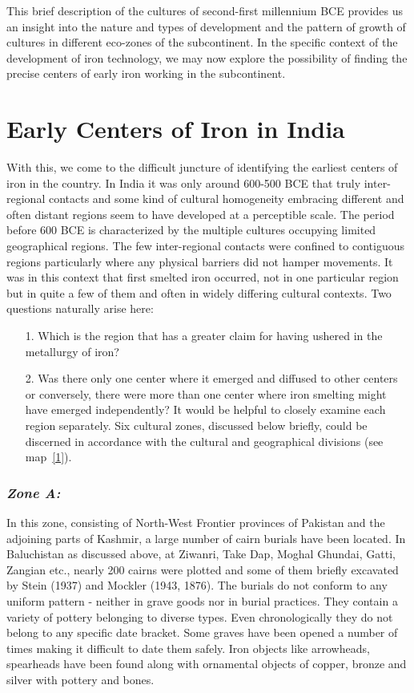This brief description of the cultures of second-first millennium BCE provides us an insight into the nature and types of development and the pattern of growth of cultures in different eco-zones of the subcontinent. In the specific context of the development of iron technology, we may now explore the possibility of finding the precise centers of early iron working in the subcontinent.

\section*{Early Centers of Iron in India}\label{section-4}

With this, we come to the difficult juncture of identifying the earliest centers of iron in the country. In India it was only around 600-500 BCE that truly inter-regional contacts and some kind of cultural homogeneity embracing different and often distant regions seem to have developed at a perceptible scale. The period before 600 BCE is characterized by the multiple cultures occupying limited geographical regions. The few inter-regional contacts were confined to contiguous regions particularly where any physical barriers did not hamper movements. It was in this context that first smelted iron occurred, not in one particular region but in quite a few of them and often in widely differing cultural contexts. Two questions naturally arise here: 
\begin{itemize}
\item[1.] Which is the region that has a greater claim for having ushered in the metallurgy of iron?

\item[2.] Was there only one center where it emerged and diffused to other centers or conversely, there were more than one center where iron smelting might have emerged independently? It would be helpful to closely examine each region separately. Six cultural zones, discussed below briefly, could be discerned in accordance with the cultural and geographical divisions (see map~\ref{1}).
\end{itemize}

\subsubsection*{\textit{Zone A:}}

In this zone, consisting of North-West Frontier provinces of Pakistan and the adjoining parts of Kashmir, a large number of cairn burials have been located. In Baluchistan as discussed above, at Ziwanri, Take Dap, Moghal Ghundai, Gatti, Zangian etc., nearly 200 cairns were plotted and some of them briefly excavated by Stein (1937) and Mockler (1943, 1876). The burials do not conform to any uniform pattern - neither in grave goods nor in burial practices. They contain a variety of pottery belonging to diverse types. Even chronologically they do not belong to any specific date bracket. Some graves have been opened a number of times making it difficult to date them safely. Iron objects like arrowheads, spearheads have been found along with ornamental objects of copper, bronze and silver with pottery and bones.

